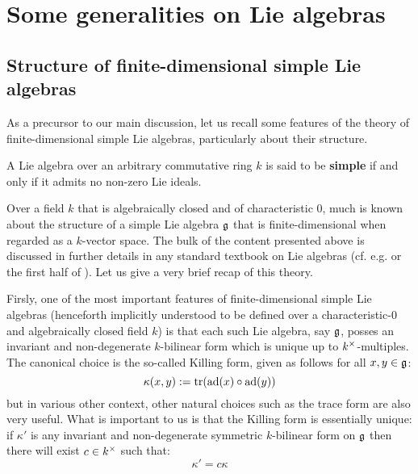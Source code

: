 \section{Some generalities on Lie algebras}
    \subsection{Structure of finite-dimensional simple Lie algebras}
        As a precursor to our main discussion, let us recall some features of the theory of finite-dimensional simple Lie algebras, particularly about their structure.

        \begin{definition}
            A Lie algebra over an arbitrary commutative ring $k$ is said to be \textbf{simple} if and only if it admits no non-zero Lie ideals. 
        \end{definition}

        Over a field $k$ that is algebraically closed and of characteristic $0$, much is known about the structure of a simple Lie algebra $\mathfrak{g}$ that is finite-dimensional when regarded as a $k$-vector space. The bulk of the content presented above is discussed in further details in any standard textbook on Lie algebras (cf. e.g. \cite{humphreys_lie_algebras} or the first half of \cite{carter_affine_lie_algebras}). Let us give a very brief recap of this theory.

        Firsly, one of the most important features of finite-dimensional simple Lie algebras (henceforth implicitly understood to be defined over a characteristic-$0$ and algebraically closed field $k$) is that each such Lie algebra, say $\mathfrak{g}$, posses an invariant and non-degenerate $k$-bilinear form which is unique up to $k^{\x}$-multiples. The canonical choice is the so-called Killing form, given as follows for all $x, y \in \mathfrak{g}$:
            $$\kappa(x, y) := \operatorname{tr}(\mathrm{ad}(x) \circ \mathrm{ad}(y))$$
        but in various other context, other natural choices such as the trace form are also very useful. What is important to us is that the Killing form is essentially unique: if $\kappa'$ is any invariant and non-degenerate symmetric $k$-bilinear form on $\mathfrak{g}$ then there will exist $c \in k^{\x}$ such that:
            $$\kappa' = c \kappa$$

